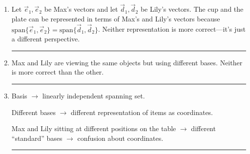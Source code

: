\documentclass{article}
\begin{document}
	\Large\bf

	\medskip


	\begin{enumerate}
		\color{Violet} \vspace{.2cm} \hrule

		\item Let $\vec e_1,\vec e_2$ be Max's vectors and let $\vec d_1,\vec d_2$ be Lily's vectors.
			The cup and the plate can be represented in terms of Max's and
			Lily's vectors because $\mathrm{span}\{\vec e_1,\vec e_2\}=\mathrm{span}\{\vec d_1,\vec d_2\}$.
			Neither representation is more correct---it's just a different perspective.

			\vspace{.2cm} \hrule

		\item Max and Lily are viewing the same objects but using different bases. Neither is more
			correct than the other.

			\vspace{.2cm} \hrule

		\item Basis $\to$ linearly independent spanning set. 

			Different bases $\to$ different representation
			of items as coordinates. 

			Max and Lily sitting at different positions on the table $\to$ different
			``standard'' bases $\to$ confusion about coordinates.
			 \vspace{.2cm} \hrule
	\end{enumerate}
\end{document}

